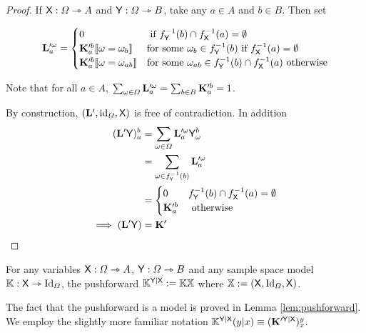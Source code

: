 \begin{proof}
If $\mathsf{X}:\Omega\rightarrowtriangle A$ and $\mathsf{Y}:\Omega\rightarrowtriangle B$, take any $a\in A$ and $b\in B$. Then set

\begin{align}
	\mathbf{L}_a^{\prime \omega} = \begin{cases}
					0 & \text{ if } f_{\mathsf{Y}}^{-1}(b)\cap f_{\mathsf{X}}^{-1}(a)=\emptyset\\
					\mathbf{K}_a^{\prime b} \llbracket \omega = \omega_b \rrbracket & \text{for some }\omega_b\in f_{\mathsf{Y}}^{-1}(b) \text{ if }f_{\mathsf{X}}^{-1}(a)=\emptyset\\
					\mathbf{K}_a^{\prime b} \llbracket \omega = \omega_{ab} \rrbracket & \text{for some }\omega_{ab}\in f_{\mathsf{Y}}^{-1}(b)\cap f_{\mathsf{X}}^{-1}(a)\text{ otherwise}\\
					\end{cases}
\end{align}

Note that for all $a\in A$, $\sum_{\omega\in \Omega}\mathbf{L}^{\prime\omega}_a = \sum_{b\in B} \mathbf{K}_a^{\prime b} = 1$.

By construction, $(\mathbf{L}',\text{id}_\Omega,\mathsf{X})$ is free of contradiction. In addition
\begin{align}
	(\mathbf{L}'\mathsf{Y})_a^b &= \sum_{\omega\in \Omega} \mathbf{L}^{\prime \omega}_a \mathsf{Y}_\omega^b\\
							&= \sum_{\omega\in f_{\mathsf{Y}}^{-1}(b)} \mathbf{L}_a^{\prime \omega}\\
							&= \begin{cases}
							 0 & f_{\mathsf{Y}}^{-1}(b)\cap f_{\mathsf{X}}^{-1}(a)=\emptyset\\
							 \mathbf{K}_a^{\prime b} & \text{ otherwise }
							\end{cases}\\
		\implies (\mathbf{L}'\mathsf{Y}) &= \mathbf{K}'
\end{align}
\end{proof}

\begin{definition}
For any variables $\mathsf{X}:\Omega\rightarrowtriangle A$, $\mathsf{Y}:\Omega\rightarrowtriangle B$ and any sample space model $\mathbb{K}:\mathsf{X}\rightarrowtriangle \mathrm{Id}_\Omega$, the pushforward $\mathbb{K}^{\mathsf{Y}|\mathsf{X}}:= \mathbb{K}\mathbb{X}$ where $\mathbb{X}:=(\mathsf{X},\mathrm{Id}_\Omega,\mathsf{X})$.
\end{definition}

The fact that the pushforward is a model is proved in Lemma \ref{lem:pushforward}. We employ the slightly more familiar notation $\mathbb{K}^{\mathsf{Y}|\mathsf{X}}(y|x)\equiv (\mathbf{K}^{\prime \mathsf{Y}|\mathsf{X}})^y_x$.

